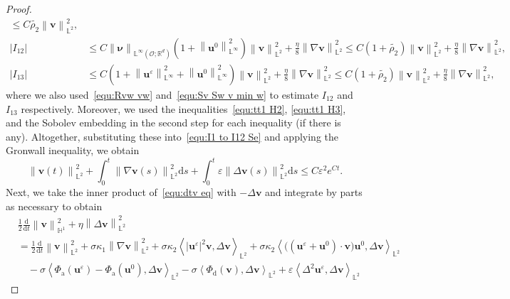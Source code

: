 \documentclass[11pt, reqno]{amsart}
\theoremstyle{definition}
\numberwithin{equation}{section}
\newcommand{\bff}{\boldsymbol}
\newcommand{\bb}{\mathbb}
\newcommand{\ddt}{\frac{\mathrm{d}}{\mathrm{d}t}}
\newcommand{\ds}{\mathrm{d}s}
\newcommand{\norm}[2]{\left\|{#1}\right\|_{#2}}
\newcommand{\inpro}[2]{\left\langle#1,#2\right\rangle}
\newcommand{\abs}[1]{\left|{#1}\right|}
\begin{document}
\begin{proof}
\begin{align*}
    \leq 
    C\widetilde{\rho_2} \norm{\bff{v}}{\bb{L}^2}^2,
    \\
    \abs{I_{12}}
    &\leq
    C \norm{\bff{\nu}}{\bb{L}^\infty(\mathscr{O};\bb{R}^d)} \left(1+ \norm{\bff{u}^0}{\bb{L}^\infty}^2 \right) \norm{\bff{v}}{\bb{L}^2}^2
    +
    \frac{\eta}{8} \norm{\nabla \bff{v}}{\bb{L}^2}^2
    \leq 
    C(1+\widetilde{\rho_2}) \norm{\bff{v}}{\bb{L}^2}^2
    +
    \frac{\eta}{8} \norm{\nabla \bff{v}}{\bb{L}^2}^2,
    \\
    \abs{I_{13}}
    &\leq
    C\left(1+\norm{\bff{u}^\varepsilon}{\bb{L}^\infty}^2 + \norm{\bff{u}^0}{\bb{L}^\infty}^2\right) \norm{\bff{v}}{\bb{L}^2}^2
    +
    \frac{\eta}{8} \norm{\nabla \bff{v}}{\bb{L}^2}^2
    \leq
    C(1+\widetilde{\rho_2}) \norm{\bff{v}}{\bb{L}^2}^2
    +
    \frac{\eta}{8} \norm{\nabla \bff{v}}{\bb{L}^2}^2,
\end{align*}
where we also used~\eqref{equ:Rvw vw} and~\eqref{equ:Sv Sw v min w} to estimate $I_{12}$ and $I_{13}$ respectively. Moreover, we used the inequalities~\eqref{equ:tt1 H2}, \eqref{equ:tt1 H3}, and the Sobolev embedding in the second step for each inequality (if there is any). Altogether, substituting these into~\eqref{equ:I1 to I12 Se} and applying the Gronwall inequality, we obtain
\begin{equation}\label{equ:vt eps L2}
    \norm{\bff{v}(t)}{\bb{L}^2}^2
    +
    \int_0^t \norm{\nabla \bff{v}(s)}{\bb{L}^2}^2 \ds 
    +
    \int_0^t \varepsilon \norm{\Delta \bff{v}(s)}{\bb{L}^2}^2 \ds
    \leq
    C\varepsilon^2 e^{Ct}.
\end{equation}
Next, we take the inner product of~\eqref{equ:dtv eq} with $-\Delta \bff{v}$ and integrate by parts as necessary to obtain
\begin{align}\label{equ:J1 to J16 nab v}
    &\frac12 \ddt \norm{\bff{v}}{\bb{H}^1}^2
    +
    \eta \norm{\Delta \bff{v}}{\bb{L}^2}^2
    \nonumber\\
    &=
    \frac12 \ddt \norm{\bff{v}}{\bb{L}^2}^2
    +
    \sigma\kappa_1 \norm{\nabla \bff{v}}{\bb{L}^2}^2
    +
    \sigma\kappa_2 \inpro{|\bff{u}^\varepsilon|^2 \bff{v}}{\Delta \bff{v}}_{\bb{L}^2}
    +
    \sigma\kappa_2 \inpro{\big((\bff{u}^\varepsilon+\bff{u}^0)\cdot \bff{v}\big) \bff{u}^0}{\Delta \bff{v}}_{\bb{L}^2}
    \nonumber\\
    &\quad
    -
    \sigma \inpro{\Phi_{\mathrm{a}}(\bff{u}^\varepsilon)-\Phi_{\mathrm{a}}(\bff{u}^0)}{\Delta \bff{v}}_{\bb{L}^2}
    -
    \sigma \inpro{\Phi_{\mathrm{d}}(\bff{v})}{\Delta \bff{v}}_{\bb{L}^2}
    +
    \varepsilon \inpro{\Delta^2 \bff{u}^\varepsilon}{\Delta \bff{v}}_{\bb{L}^2}

\end{align}
\end{proof}
\end{document}
